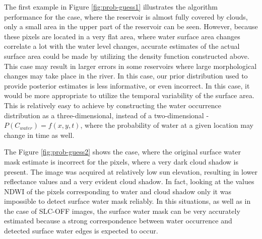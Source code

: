 The first example in Figure \ref{fig:prob-guess1} illustrates the algorithm performance for the case, where the reservoir is almost fully covered by clouds, only a small area in the upper part of the reservoir can be seen. However, because these pixels are located in a very flat area, where water surface area changes correlate a lot with the water level changes, accurate estimates of the actual surface area could be made by utilizing the density function constructed above. This case may result in larger errors in some reservoirs where large morphological changes may take place in the river. In this case, our prior distribution used to provide posterior estimates is less informative, or even incorrect. In this case, it would be more appropriate to utilize the temporal variability of the surface area. This is relatively easy to achieve by constructing the water occurrence distribution as a three-dimensional, instead of a two-dimensional - $P(C_{water}) = f(x,y,t)$, where the probability of water at a given location may change in time as well. 


The Figure \ref{fig:prob-guess2} shows the case, where the original surface water mask estimate is incorrect for the pixels, where a very dark cloud shadow is present. The image was acquired at relatively low sun elevation, resulting in lower reflectance values and a very evident cloud shadow. In fact, looking at the values NDWI of the pixels corresponding to water and cloud shadow only it was impossible to detect surface water mask reliably. In this situations, as well as in the case of SLC-OFF images, the surface water mask can be very accurately estimated because a strong correspondence between water occurrence and detected surface water edges is expected to occur.


